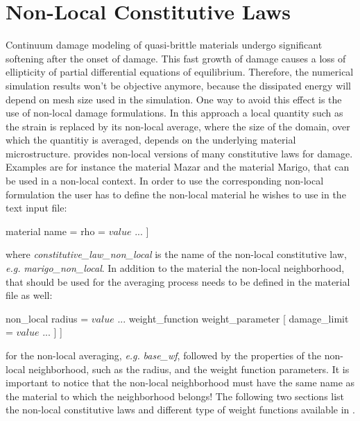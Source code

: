 \section{Non-Local Constitutive Laws \label{sect:smm:CLNL}}

Continuum damage modeling of quasi-brittle materials undergo significant softening after the onset of damage. This fast growth of damage causes a loss of ellipticity of partial differential equations of equilibrium. Therefore, the numerical simulation results won't be objective anymore, because the dissipated energy will depend on mesh size used in the simulation. One way to avoid this effect is the use of non-local damage formulations. In this approach a local quantity such as the strain is replaced by its non-local average, where the size of the domain, over which the quantitiy is averaged, depends on the underlying material microstructure. 
\akantu provides non-local versions of many constitutive laws for damage. Examples are for instance the material Mazar and the material Marigo, that can be used in a non-local context. In order to use the corresponding non-local formulation the user has to define the non-local material he wishes to use in the text input file:
\begin{cpp}
  material %
     name = %
     rho = $value$
     ...
  ]
\end{cpp}
where \emph{constitutive\_law\_non\_local} is the name of the non-local constitutive law, \textit{e.g.} \emph{marigo\_non\_local}.
In addition to the material the non-local neighborhood, that should be used for the averaging process needs to be defined in the material file as well: 
\begin{cpp}
  non_local %
     radius = $value$
     ...
      weight_function weight_parameter [
        damage_limit = $value$
        ...
     ]
  ]
\end{cpp}
for the non-local averaging, \textit{e.g.} \emph{base\_wf}, followed by the properties of the non-local neighborhood, such as the radius, and the weight function parameters. It is important to notice that the non-local neighborhood must have the same name as the material to which the neighborhood belongs!
The following two sections list the non-local constitutive laws and different type of weight functions available in \akantu.

